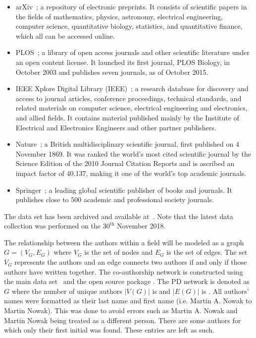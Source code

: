 \documentclass{article}
\theoremstyle{definition}
\newcommand{\authors}{}
\newcommand{\edges}{}
\begin{document}
\begin{multicols}{2}
    \begin{itemize}
        \item arXiv~\cite{mckiernan2000}; a repository of electronic preprints.
        It consists of scientific
        papers in the fields of mathematics, physics, astronomy, electrical engineering,
        computer science, quantitative biology, statistics, and quantitative finance,
        which all can be accessed online.
        \item PLOS~\cite{plos}; a library of open access journals and other scientific literature
        under an open content license. It launched its first journal, PLOS Biology,
        in October 2003 and publishes seven journals, as of October 2015.
        \item IEEE Xplore Digital Library (IEEE)~\cite{ieee}; a research database for discovery
        and access to journal articles, conference proceedings, technical standards,
        and related materials on computer science, electrical engineering and electronics,
        and allied fields. It contains material published mainly by the Institute of
        Electrical and Electronics Engineers and other partner publishers. 
        \item Nature~\cite{nature}; a British multidisciplinary scientific journal,
        first published on 4 November 1869. It was ranked the world's most cited
        scientific journal by the Science Edition of the 2010 Journal Citation Reports
        and is ascribed an impact factor of 40.137, making it one of the world's
        top academic journals.
        \item Springer~\cite{springer}; a leading global scientific publisher of
        books and journals. It publishes close to 500 academic and professional
        society journals.
    \end{itemize}
\end{multicols}

The data set has been archived and available at~\cite{pd_data_2018}. Note that the latest data
collection was performed on the \(30^{\text{th}}\) November 2018.

The relationship between the authors within a field will be modeled as a graph
\(G = (V_G, E_G)\) where \(V_G\) is the set of nodes and \(E_G\)  is the set of
edges. The set \(V_G\) represents the authors and an edge connects two authors
if and only if those authors have written together. The co-authorship network is
constructed using the main data set~\cite{pd_data_2018} and the open source package
\cite{networkx}. The PD network is denoted as \(G\) where the
number of unique authors \(|V(G)|\) is \authors and \(|E(G)|\) is \edges.
All authors' names were formatted as their last name and first name (i.e.
Martin A. Nowak to Martin Nowak). This was done to avoid errors such as Martin
A. Nowak and Martin Nowak being treated as a different person. There are some
authors for which only their first initial was found. These entries are left as
such.
\end{document}
